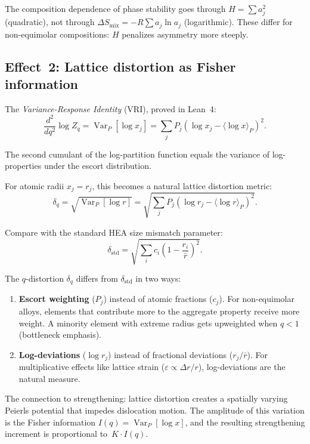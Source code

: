 \documentclass[12pt,letterpaper]{article}
\theoremstyle{definition}
\DeclareMathOperator{\Var}{Var}
\begin{document}
The composition dependence of phase stability goes through $H = \sum a_j^2$ (quadratic), not through $\Delta S_{\mathrm{mix}} = -R\sum a_j \ln a_j$ (logarithmic).  These differ for non-equimolar compositions: $H$ penalizes asymmetry more steeply.

\subsection{Effect~2: Lattice distortion as Fisher information}

The \emph{Variance-Response Identity} (VRI), proved in Lean~4:
\begin{equation}\label{eq:VRI}
  \frac{d^2}{dq^2} \log Z_q = \Var_P[\log x_j] = \sum_j P_j (\log x_j - \langle \log x \rangle_P)^2.
\end{equation}

The second cumulant of the log-partition function equals the variance of log-properties under the escort distribution.

For atomic radii $x_j = r_j$, this becomes a natural lattice distortion metric:
\begin{equation}\label{eq:delta_q}
  \delta_q = \sqrt{\Var_P[\log r]} = \sqrt{\sum_j P_j (\log r_j - \langle \log r \rangle_P)^2}.
\end{equation}

Compare with the standard HEA size mismatch parameter:
\begin{equation}
  \delta_{\mathrm{std}} = \sqrt{\sum_i c_i \left(1 - \frac{r_i}{\bar{r}}\right)^2}.
\end{equation}

The $q$-distortion $\delta_q$ differs from $\delta_{\mathrm{std}}$ in two ways:
\begin{enumerate}
  \item \textbf{Escort weighting} ($P_j$) instead of atomic fractions ($c_j$).  For non-equimolar alloys, elements that contribute more to the aggregate property receive more weight.  A minority element with extreme radius gets upweighted when $q < 1$ (bottleneck emphasis).
  \item \textbf{Log-deviations} ($\log r_j$) instead of fractional deviations ($r_j/\bar{r}$).  For multiplicative effects like lattice strain ($\varepsilon \propto \Delta r / r$), log-deviations are the natural measure.
\end{enumerate}

The connection to strengthening: lattice distortion creates a spatially varying Peierls potential that impedes dislocation motion.  The amplitude of this variation is the Fisher information $I(q) = \Var_P[\log x]$, and the resulting strengthening increment is proportional to~$K \cdot I(q)$.
\end{document}

